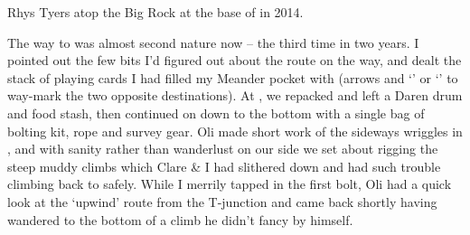 \begin{marginfigure}
\checkoddpage \ifoddpage \forcerectofloat \else \forceversofloat \fi
\centering
 \caption{Rhys Tyers atop the Big Rock at the base of  in 2014. }
 \label{the big rock}
\end{marginfigure}

The way to  was almost second nature now -- the third time in two
years. I pointed out the few bits I'd figured out about the route on the
way, and dealt the stack of playing cards I had filled my Meander pocket
with (arrows and `' or `' to way-mark the two opposite
destinations). At , we repacked and left a Daren drum and food
stash, then continued on down to the bottom with a single bag of bolting
kit, rope and survey gear. Oli made short work of the sideways wriggles
in , and with sanity rather than wanderlust on our
side we set about rigging the steep muddy climbs which Clare \& I had
slithered down and had such trouble climbing back to safely. While I merrily tapped in
the first bolt, Oli had a quick look at the `upwind' route from the
T-junction and came back shortly having wandered to the bottom of a
climb he didn't fancy by himself.

